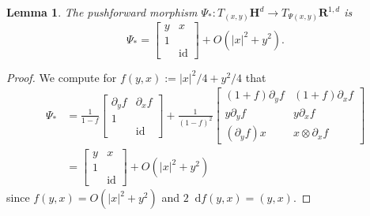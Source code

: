 \documentclass[reqno,11pt]{amsart}
\newcommand{\RR}{\mathbf{R}}
\newcommand{\Hyp}{\mathbf H}
\DeclareMathOperator{\id}{id}
\newcommand*\dif{\mathop{}\!\mathrm{d}}
\newtheorem{lemma}[theorem]{Lemma}
\theoremstyle{definition}
\numberwithin{equation}{section}
\begin{document}
\begin{lemma}
The pushforward morphism $\Psi_*: T_{(x, y)} \Hyp^d \to T_{\Psi(x, y)} \RR^{1, d}$ is
\begin{equation}\label{pushforward estimates}
\Psi_* = \begin{bmatrix}y & x \\ 1 \\ & \id \end{bmatrix} + O(|x|^2 + y^2).
\end{equation}
\end{lemma}
\begin{proof}
We compute for $f(y, x) := |x|^2/4 + y^2/4$ that
\begin{align*}
\Psi_* &= \frac{1}{1 - f} \begin{bmatrix} \partial_y f & \partial_x f \\ 1 \\ & \id \end{bmatrix} + \frac{1}{(1 - f)^2} \begin{bmatrix}(1 + f) \partial_y f & (1 + f) \partial_x f \\
y \partial_y f & y \partial_x f \\
(\partial_y f) x & x \otimes \partial_x f
\end{bmatrix} \\
&= \begin{bmatrix}y & x \\ 1 \\ & \id \end{bmatrix} + O(|x|^2 + y^2)
\end{align*}
since $f(y, x) = O(|x|^2 + y^2)$ and $2\dif f(y, x) = (y, x)$.
\end{proof}
\end{document}
